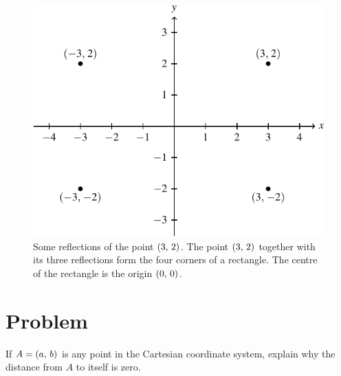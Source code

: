 \documentclass[a4paper,oneside,12pt]{article}
\begin{document}
\begin{figure}[!htbp]
\centering
\includegraphics[scale=1.1]{image/03/reflection.pdf}
\caption{%
  Some reflections of the point $\left\lparen{3},\, {2}\right\rparen$.  The point
  $\left\lparen{3},\, {2}\right\rparen$ together with its three reflections form the four
  corners of a rectangle.  The centre of the rectangle is the origin
  $\left\lparen{0},\, {0}\right\rparen$.
}
\label{fig:reflections_of_point}
\end{figure}



\section*{Problem}

\begin{problem}
\item If $A = \left\lparen{a},\, {b}\right\rparen$ is any point in the Cartesian coordinate
  system, explain why the distance from $A$ to itself is zero.
\end{problem}
\end{document}
